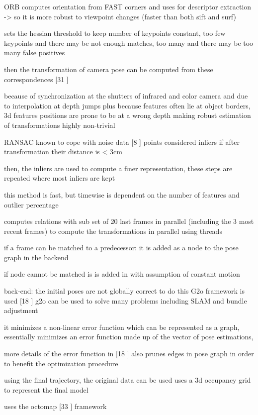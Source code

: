 ORB computes orientation from FAST corners and uses for descriptor extraction -> so it is more robust to viewpoint changes (faster than both sift and surf)

sets the hessian threshold to keep number of keypoints constant, too few keypoints and there may be not enough matches, too many and there may be too many false positives

then the transformation of camera pose can be computed from these correspondences [31 \cite{Umeyama91Least}]


because of synchronization at the shutters of infrared and color camera and due to interpolation at depth jumps
plus because features often lie at object borders, 3d features positions are prone to be at a wrong depth making robust estimation of transformations highly non-trivial

RANSAC known to cope with noise data [8 \cite{Fischler81Random}]
points considered inliers if after transformation their distance is < 3cm

then, the inliers are used to compute a finer representation, these steps are repeated where most inliers are kept

this method is fast, but timewise is dependent on the number of features and outlier percentage

computes relations with sub set of 20 last frames in parallel (including the 3 most recent frames) to compute the transformations in parallel using threads

if a frame can be matched to a predecessor: it is added as a node to the pose graph in the backend

if node cannot be matched is is added in with assumption of constant motion

back-end:
the initial poses are not globally correct
to do this G2o framework is used [18 \cite{Kummerle11G}]
g2o can be used to solve many problems including SLAM and bundle adjustment

it minimizes a non-linear error function which can be represented as a graph, essentially minimizes an error function made up of the vector of pose estimations, 

more details of the error function in [18 \cite{Kummerle11G}]
also prunes edges in pose graph in order to benefit the optimization procedure

using the final trajectory, the original data can be used 
uses a 3d occupancy grid to represent the final model

uses the octomap [33 \cite{Wurm10Octomap}] framework

